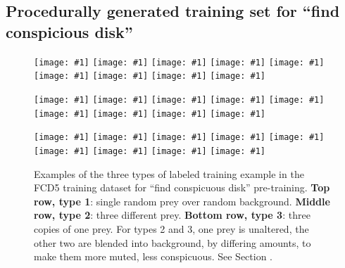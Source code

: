 \documentclass[letterpaper]{article}
\newcommand{\ignine}[1]{\texttt{[image: \#1]}}
\begin{document}
\subsection{Procedurally generated training set for “find conspicious disk”}


\begin{figure}[H]
    \begin{minipage}{\linewidth}
    \ignine{20220303_UVSfqCzewt_38_20.png}
    \hfill
    \ignine{20220303_SBWaLRHOzk_56_33.png}
    \hfill
    \ignine{20220303_bUMqcbutgJ_25_78.png}
    \hfill
    \ignine{20220303_HZzUzWWqcC_54_28.png}
    \hfill
    \ignine{20220303_inuPKUxnHQ_72_71.png}
    \hfill
    \ignine{20220303_RRGCwhmcJc_101_84.png}
    \hfill
    \ignine{20220303_PYinyJAWaj_61_60.png}
    \hfill
    \ignine{20220303_TNXfhQtzYa_92_91.png}
    \hfill
    \ignine{20220303_cDMtFaTYKk_63_54.png}
    \end{minipage}
    \begin{minipage}{\linewidth}
    \vspace{0.1cm}
    \ignine{20220303_wIRPERwSCh_49_63.png}
    \hfill
    \ignine{20220303_edDsCjbHdf_61_92.png}
    \hfill
    \ignine{20220303_fGMFBgMQDX_93_86.png}
    \hfill
    \ignine{20220303_jQREPLQyuL_33_39.png}
    \hfill
    \ignine{20220303_ijBOHTccYX_104_101.png}
    \hfill
    \ignine{20220303_KAoOFAqFyU_80_58.png}
    \hfill
    \ignine{20220303_NExMwxEbzU_85_92.png}
    \hfill
    \ignine{20220303_kpcUyhHXOh_91_98.png}
    \hfill
    \ignine{20220303_oWPwPGkcSb_82_22.png}
    \end{minipage}
    \begin{minipage}{\linewidth}
    \vspace{0.1cm}
    \ignine{20220303_uAEPxMZbeo_83_45.png}
    \hfill
    \ignine{20220303_cADfBauZUV_47_32.png}
    \hfill
    \ignine{20220303_YAMfudJxeH_30_84.png}
    \hfill
    \ignine{20220303_JeyBgDfMcN_40_82.png}
    \hfill
    \ignine{20220303_OaOJaByhbU_90_55.png}
    \hfill
    \ignine{20220303_mhYpDjxaKf_78_57.png}
    \hfill
    \ignine{20220303_ASsEgFUlly_23_60.png}
    \hfill
    \ignine{20220303_nzgItDrYqT_71_99.png}
    \hfill
    \ignine{20220303_QuHYtnPora_72_73.png}
    \end{minipage}
    \caption{Examples of the three types of labeled training example in the FCD5 training dataset for “find conspicuous disk” pre-training. \textbf{Top row, type 1}: single random prey over random background. \textbf{Middle row, type 2}: three different prey. \textbf{Bottom row, type 3}: three copies of one prey. For types 2 and 3, one prey is unaltered, the other two are blended into background, by differing amounts, to make them more muted, less conspicuous. See Section .}
    \label{fig:fcd5_examples}
\end{figure}
\end{document}
